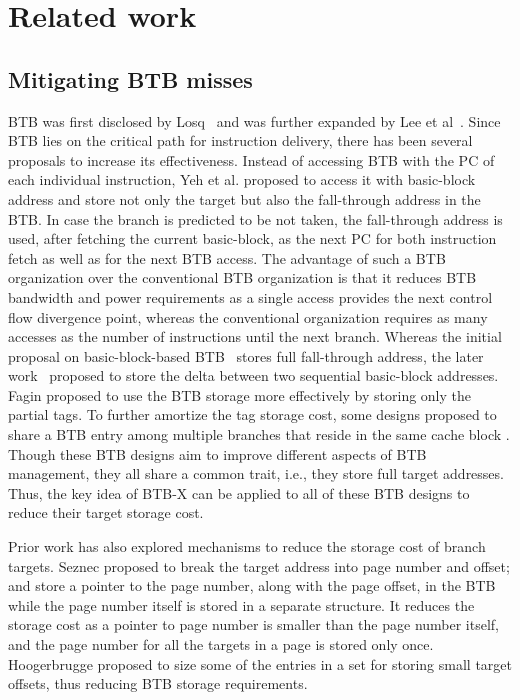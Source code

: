 \section{Related work}
\label{hpca:sec:related}

\subsection{Mitigating BTB misses}
BTB was first disclosed by Losq~\cite{losq} and was further expanded by Lee et al~\cite{btb}. Since BTB lies on the critical path for instruction delivery, there has been several proposals to increase its effectiveness. Instead of accessing BTB with the PC of each individual instruction, Yeh et al. \cite{bbtb} proposed to access it with basic-block address and store not only the target but also the fall-through address in the BTB. In case the branch is predicted to be not taken, the fall-through address is used, after fetching the current basic-block, as the next PC for both instruction fetch as well as for the next BTB access. The advantage of such a BTB organization over the conventional BTB organization is that it reduces BTB bandwidth and power requirements as a single access provides the next control flow divergence point, whereas the conventional organization requires as many accesses as the number of instructions until the next branch. Whereas the initial proposal on basic-block-based BTB~\cite{bbtb} stores full fall-through address, the later work~\cite{fbtb} proposed to store the delta between two sequential basic-block addresses. Fagin \cite{fagin1997partial} proposed to use the BTB storage more effectively by storing only the partial tags. To further amortize the tag storage cost, some designs proposed to share a BTB entry among multiple branches that reside in the same cache block \cite{amdbtb, confluence}. Though these BTB designs aim to improve different aspects of BTB management, they all share a common trait, i.e., they store full target addresses. Thus, the key idea of BTB-X can be applied to all of these BTB designs to reduce their target storage cost.

Prior work \cite{DUPN, ittage, jan, pdede, btbxCAL, btbxPACT} has also explored mechanisms to reduce the storage cost of branch targets. Seznec \cite{DUPN, ittage} proposed to break the target address into page number and offset; and store a pointer to the page number, along with the page offset, in the BTB while the page number itself is stored in a separate structure. It reduces the storage cost as a pointer to page number is smaller than the page number itself, and the page number for all the targets in a page is stored only once. Hoogerbrugge \cite{jan} proposed to size some of the entries in a set for storing small target offsets, thus reducing BTB storage requirements. 

